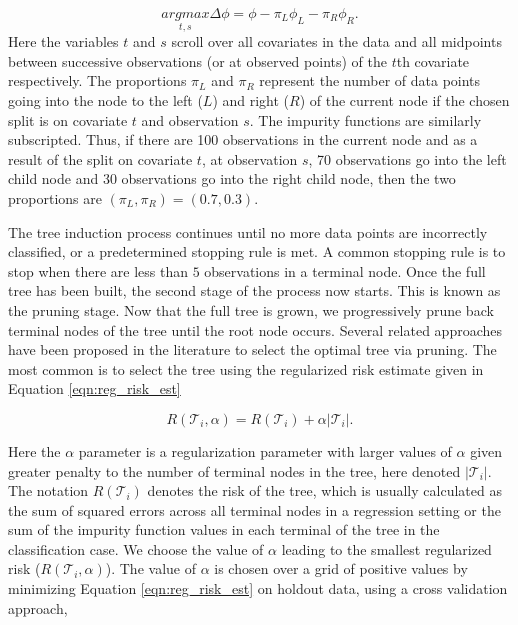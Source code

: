 \begin{equation}
\underset{t,s}{argmax} \Delta\phi = \phi - \pi_L\phi_L-\pi_R\phi_R.
\end{equation}
Here the variables $t$ and $s$ scroll over all covariates in the data and all midpoints between successive observations (or at observed points) of the $t$th covariate respectively. The proportions $\pi_L$ and $\pi_R$ represent the number of data points going into the node to the left ($L$) and right ($R$) of the current node if the chosen split is on covariate $t$ and observation $s$. The impurity functions are similarly subscripted. Thus, if there are 100 observations in the current node and as a result of the split on covariate $t$, at observation $s$, 70 observations go into the left child node and 30 observations go into the right child node, then the two proportions are $(\pi_L, \pi_R) = (0.7, 0.3)$. 

The tree induction process continues until no more data points are incorrectly classified, or a predetermined stopping rule is met. A common stopping rule is to stop when there are less than $5$ observations in a terminal node. Once the full tree has been built, the second stage of the process now starts. This is known as the pruning stage. Now that the full tree is grown, we progressively prune back terminal nodes of the tree until the root node occurs. Several related approaches have been proposed in the literature to select the optimal tree via pruning. The most common is to select the tree using the regularized risk estimate given in Equation \ref{eqn:reg_risk_est} 

\begin{equation}\label{eqn:reg_risk_est}
R(\mathcal{T}_i,\alpha) = R(\mathcal{T}_i) + \alpha \vert \mathcal{T}_i \vert. 
\end{equation}

Here the $\alpha$ parameter is a regularization parameter with larger values of $\alpha$ given greater penalty to the number of terminal nodes in the tree, here denoted $\vert \mathcal{T}_i\vert$. The notation $R(\mathcal{T}_i)$ denotes the risk of the tree, which is usually calculated as the sum of squared errors across all terminal nodes in a regression setting or the sum of the impurity function values in each terminal of the tree in the classification case. We choose the value of $\alpha$ leading to the smallest regularized risk ($R(\mathcal{T}_i,\alpha)$).  The value of $\alpha$ is chosen over a grid of positive values by minimizing Equation \ref{eqn:reg_risk_est} on holdout data, using a cross validation approach, 

